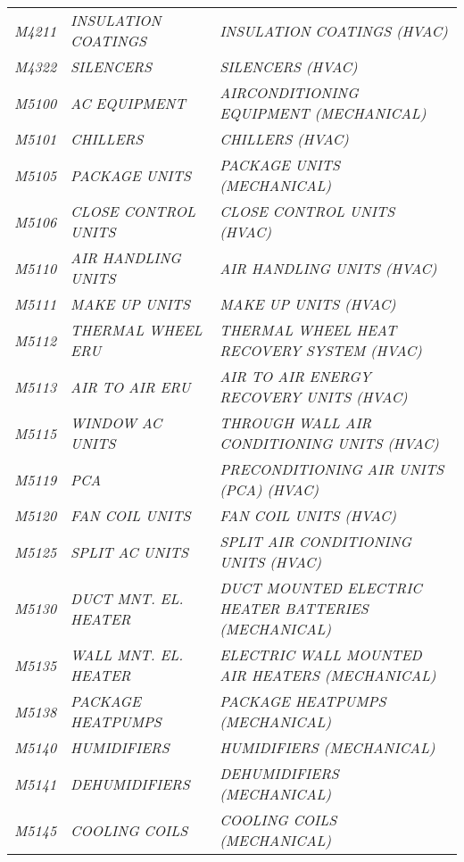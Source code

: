 \begin{landscape}
\begin{longtable}[l]{l%
                  l|%
                  l|}
\itshape M4211       &\itshape INSULATION COATINGS   &\itshape INSULATION COATINGS (HVAC)   \\
\itshape M4322       &\itshape SILENCERS   &\itshape SILENCERS (HVAC)   \\
\itshape M5100       &\itshape AC EQUIPMENT   &\itshape AIRCONDITIONING EQUIPMENT (MECHANICAL)   \\
\itshape M5101       &\itshape CHILLERS   &\itshape CHILLERS (HVAC)   \\
\itshape M5105       &\itshape PACKAGE UNITS   &\itshape PACKAGE UNITS (MECHANICAL)   \\
\itshape M5106       &\itshape CLOSE CONTROL UNITS   &\itshape CLOSE CONTROL UNITS (HVAC)   \\
\itshape M5110       &\itshape AIR HANDLING UNITS   &\itshape AIR HANDLING UNITS (HVAC)   \\
\itshape M5111       &\itshape MAKE UP UNITS   &\itshape MAKE UP UNITS (HVAC)   \\
\itshape M5112       &\itshape THERMAL WHEEL ERU   &\itshape THERMAL WHEEL HEAT RECOVERY SYSTEM (HVAC)   \\
\itshape M5113       &\itshape AIR TO AIR ERU   &\itshape AIR TO AIR ENERGY RECOVERY UNITS (HVAC)   \\
\itshape M5115       &\itshape WINDOW AC UNITS   &\itshape THROUGH WALL AIR CONDITIONING UNITS (HVAC)   \\
\itshape M5119       &\itshape PCA   &\itshape PRECONDITIONING AIR UNITS (PCA) (HVAC)   \\
\itshape M5120       &\itshape FAN COIL UNITS   &\itshape FAN COIL UNITS (HVAC)   \\
\itshape M5125       &\itshape SPLIT AC UNITS   &\itshape SPLIT AIR CONDITIONING UNITS (HVAC)   \\
\itshape M5130       &\itshape DUCT MNT. EL. HEATER   &\itshape DUCT MOUNTED ELECTRIC HEATER BATTERIES (MECHANICAL)   \\
\itshape M5135       &\itshape WALL MNT. EL. HEATER   &\itshape ELECTRIC WALL MOUNTED AIR HEATERS (MECHANICAL)   \\
\itshape M5138       &\itshape PACKAGE HEATPUMPS   &\itshape PACKAGE HEATPUMPS (MECHANICAL)   \\
\itshape M5140       &\itshape HUMIDIFIERS   &\itshape HUMIDIFIERS (MECHANICAL)   \\
\itshape M5141       &\itshape DEHUMIDIFIERS   &\itshape DEHUMIDIFIERS (MECHANICAL)   \\
\itshape M5145       &\itshape COOLING COILS   &\itshape COOLING COILS (MECHANICAL)   \\

\end{longtable}
\end{landscape}
